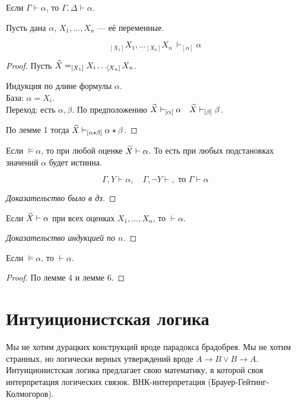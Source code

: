 \begin{lemma}
Если $\Gamma \vdash \alpha$, то $\Gamma, \Delta \vdash \alpha$.
\end{lemma}

\begin{lemma}
Пусть дана $\alpha$, $X_1,\ldots, X_n$ --- её переменные.

\[ _{[X_1]}X_1,\ldots _{[X_n]}X_n\ \vdash _{[\alpha]}\alpha  \]
\end{lemma}
\begin{proof}
    Пусть $\widetilde{X} = _{[X_1]} X_i \dots _{[X_n]} X_n$.

    Индукция по длине формулы $\alpha$.\\
    База: $\alpha = X_i$.\\
    Переход: есть $\alpha, \beta$. По предположению $\widetilde{X} \vdash _{[\alpha]} \alpha ~~~ \widetilde{X} \vdash _{[\beta]} \beta$.

    По лемме 1 тогда  $\widetilde{X} \vdash _{[\alpha \star \beta]} \alpha \star \beta$.
\end{proof}

\begin{lemma}
    Если $\vDash \alpha$, то при любой оценке $\widetilde{X} \vdash \alpha$.
    То есть при любых подстановках значений $\alpha $ будет истинна.
\end{lemma}

\begin{lemma}
    \[ \Gamma, Y \vdash \alpha, \quad \Gamma, \neg Y \vdash, \text{ то } \Gamma \vdash \alpha \]
\end{lemma}
\begin{proof}[Доказательство было в дз]
\end{proof}

\begin{lemma}
    Если $\widetilde{X} \vdash \alpha$ при всех оценках $X_1, \dots, X_n$, то $\vdash \alpha$.
\end{lemma}
\begin{proof}
    [Доказательство индукцией по $n$]
\end{proof}
\begin{theorem}
    Если $\vDash \alpha$, то $\vdash \alpha$.
\end{theorem}
\begin{proof}
    По лемме 4 и лемме 6.
\end{proof}

\section{Интуиционистская логика}
Мы не хотим дурацких конструкций вроде парадокса брадобрея.
Мы не хотим странных, но логически верных утверждений вроде $A\to B \lor B \to A$.
Интуиционистская логика предлагает свою математику, в которой своя интерпретация логических связок.
ВНК-интерпретация (Брауер-Гейтинг-Колмогоров).

